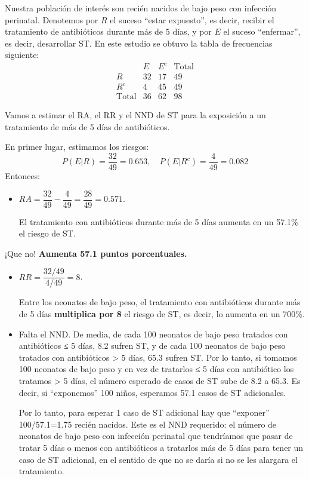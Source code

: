 \documentclass[
]{book}
\theoremstyle{definition}
\theoremstyle{definition}
\theoremstyle{definition}
\theoremstyle{definition}
\theoremstyle{remark}
\begin{document}
Nuestra población de interés son recién nacidos de bajo peso con infección perinatal. Denotemos por \(R\) el suceso ``estar expuesto'', es decir, recibir el tratamiento de antibióticos durante más de 5 días, y por \(E\) el suceso ``enfermar'', es decir, desarrollar ST. En este estudio se obtuvo la tabla de frecuencias siguiente:
\[
\begin{array}{c|cc|c}
 & E & E^c & \text{Total}\\ \hline
R & 32 & 17 & 49   \\ 
R^c & 4 & 45 & 49\\ \hline
\text{Total} & 36 & 62 & 98
\end{array}
\]

Vamos a estimar el RA, el RR y el NND de ST para la exposición a un tratamiento de más de 5 días de antibióticos.

En primer lugar, estimamos los riesgos:
\[
P(E|R)=\frac{32}{49}=0.653,\quad
P(E|R^c)=\frac{4}{49}=0.082
\]
Entonces:

\begin{itemize}
\item
  \(RA=\dfrac{32}{49}-\dfrac{4}{49}=\dfrac{28}{49}=0.571\).

  El tratamiento con antibióticos durante más de 5 días aumenta en un 57.1\% el riesgo de ST.
\end{itemize}

\begin{rmderror}
¡Que no! \textbf{Aumenta 57.1 puntos porcentuales.}
\end{rmderror}

\begin{itemize}
\item
  \(RR= \dfrac{32/49}{4/49}=8\).

  Entre los neonatos de bajo peso, el tratamiento con antibióticos durante más de 5 días \textbf{multiplica por 8} el riesgo de ST, es decir, lo aumenta en un 700\%.
\item
  Falta el NND. De media, de cada 100 neonatos de bajo peso tratados con antibióticos ≤ 5 días, 8.2 sufren ST, y de cada 100 neonatos de bajo peso tratados con antibióticos \textgreater{} 5 días, 65.3 sufren ST. Por lo tanto, si tomamos 100 neonatos de bajo peso y en vez de tratarlos ≤ 5 días con antibiótico los tratamos \textgreater{} 5 días, el número esperado de casos de ST sube de 8.2 a 65.3. Es decir, si ``exponemos'' 100 niños, esperamos 57.1 casos de ST adicionales.

  Por lo tanto, para esperar 1 caso de ST adicional hay que ``exponer'' 100/57.1=1.75 recién nacidos. Este es el NND requerido: el número de neonatos de bajo peso con infección perinatal que tendríamos que pasar de tratar 5 días o menos con antibióticos a tratarlos más de 5 días para tener un caso de ST adicional, en el sentido de que no se daría si no se les alargara el tratamiento.
\end{itemize}
\end{document}
